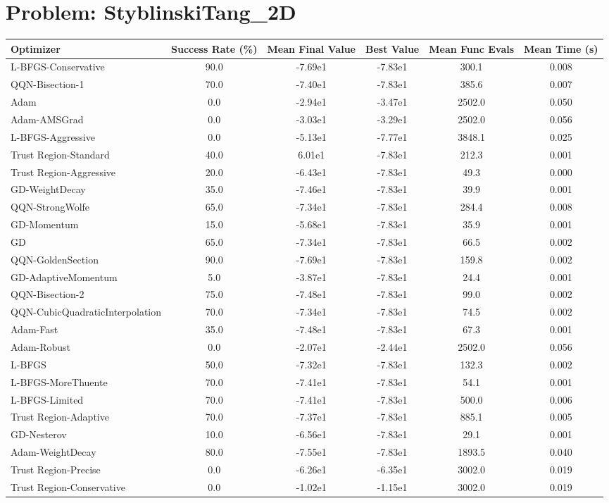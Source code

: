 \documentclass{article}
\begin{document}
\section{Problem: StyblinskiTang\_2D}
\begin{longtable}{p{3cm}*{5}{c}}
\toprule
\textbf{Optimizer} & \textbf{Success Rate (\%)} & \textbf{Mean Final Value} & \textbf{Best Value} & \textbf{Mean Func Evals} & \textbf{Mean Time (s)} \\
\midrule
L-BFGS-Conservative & 90.0 & -7.69e1 & -7.83e1 & 300.1 & 0.008 \\
QQN-Bisection-1 & 70.0 & -7.40e1 & -7.83e1 & 385.6 & 0.007 \\
Adam & 0.0 & -2.94e1 & -3.47e1 & 2502.0 & 0.050 \\
Adam-AMSGrad & 0.0 & -3.03e1 & -3.29e1 & 2502.0 & 0.056 \\
L-BFGS-Aggressive & 0.0 & -5.13e1 & -7.77e1 & 3848.1 & 0.025 \\
Trust Region-Standard & 40.0 & 6.01e1 & -7.83e1 & 212.3 & 0.001 \\
Trust Region-Aggressive & 20.0 & -6.43e1 & -7.83e1 & 49.3 & 0.000 \\
GD-WeightDecay & 35.0 & -7.46e1 & -7.83e1 & 39.9 & 0.001 \\
QQN-StrongWolfe & 65.0 & -7.34e1 & -7.83e1 & 284.4 & 0.008 \\
GD-Momentum & 15.0 & -5.68e1 & -7.83e1 & 35.9 & 0.001 \\
GD & 65.0 & -7.34e1 & -7.83e1 & 66.5 & 0.002 \\
QQN-GoldenSection & 90.0 & -7.69e1 & -7.83e1 & 159.8 & 0.002 \\
GD-AdaptiveMomentum & 5.0 & -3.87e1 & -7.83e1 & 24.4 & 0.001 \\
QQN-Bisection-2 & 75.0 & -7.48e1 & -7.83e1 & 99.0 & 0.002 \\
QQN-CubicQuadraticInterpolation & 70.0 & -7.34e1 & -7.83e1 & 74.5 & 0.002 \\
Adam-Fast & 35.0 & -7.48e1 & -7.83e1 & 67.3 & 0.001 \\
Adam-Robust & 0.0 & -2.07e1 & -2.44e1 & 2502.0 & 0.056 \\
L-BFGS & 50.0 & -7.32e1 & -7.83e1 & 132.3 & 0.002 \\
L-BFGS-MoreThuente & 70.0 & -7.41e1 & -7.83e1 & 54.1 & 0.001 \\
L-BFGS-Limited & 70.0 & -7.41e1 & -7.83e1 & 500.0 & 0.006 \\
Trust Region-Adaptive & 70.0 & -7.37e1 & -7.83e1 & 885.1 & 0.005 \\
GD-Nesterov & 10.0 & -6.56e1 & -7.83e1 & 29.1 & 0.001 \\
Adam-WeightDecay & 80.0 & -7.55e1 & -7.83e1 & 1893.5 & 0.040 \\
Trust Region-Precise & 0.0 & -6.26e1 & -6.35e1 & 3002.0 & 0.019 \\
Trust Region-Conservative & 0.0 & -1.02e1 & -1.15e1 & 3002.0 & 0.019 \\
\bottomrule
\end{longtable}
\end{document}
